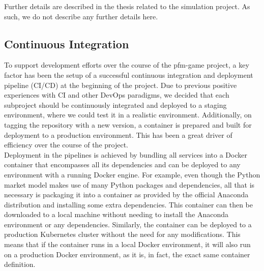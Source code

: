 Further details are described in the thesis related to the simulation project. As such, we do not describe any further details here.


\subsection{Continuous Integration}

To support development efforts over the course of the pfm-game project, a key factor has been the setup of a successful continuous integration and deployment pipeline (CI/CD) at the beginning of the project. Due to previous positive experiences with CI and other DevOps paradigms, we decided that each subproject should be continuously integrated and deployed to a staging environment, where we could test it in a realistic environment. Additionally, on tagging the repository with a new version, a container is prepared and built for deployment to a production environment. This has been a great driver of efficiency over the course of the project. \\

Deployment in the pipelines is achieved by bundling all services into a Docker container that encompasses all its dependencies and can be deployed to any environment with a running Docker engine. For example, even though the Python market model makes use of many Python packages and dependencies, all that is necessary is packaging it into a container as provided by the official Anaconda distribution and installing some extra dependencies. This container can then be downloaded to a local machine without needing to install the Anaconda environment or any dependencies. Similarly, the container can be deployed to a production Kubernetes cluster without the need for any modifications. This means that if the container runs in a local Docker environment, it will also run on a production Docker environment, as it is, in fact, the exact same container definition.